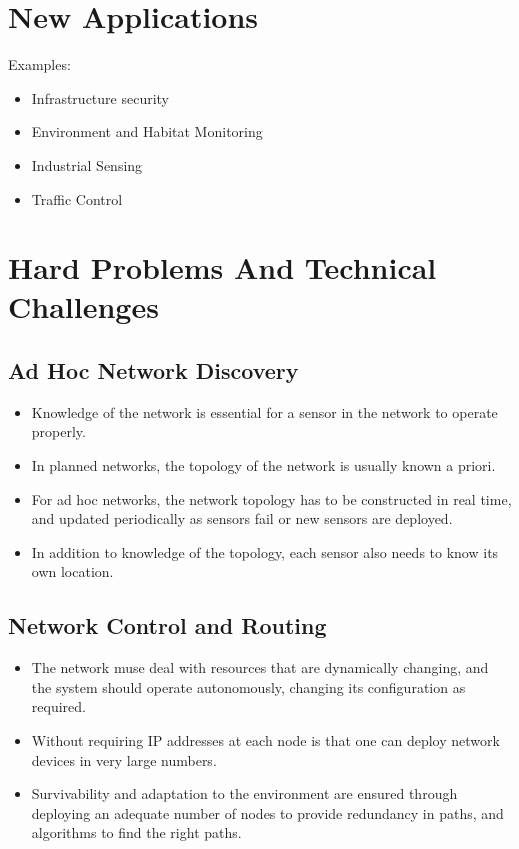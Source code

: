 \documentclass[letterpaper,10pt]{article}
\begin{document}
\section{New Applications}

Examples:
\begin{itemize}
	\item Infrastructure security
	\item Environment and Habitat Monitoring
	\item Industrial Sensing
	\item Traffic Control
\end{itemize}


\section{Hard Problems And Technical Challenges}

\subsection{Ad Hoc Network Discovery}

\begin{itemize}
	\item Knowledge of the network is essential for a sensor in the network to operate properly.
	\item In planned networks, the topology of the network is usually known a priori.
	\item For ad hoc networks, the network topology has to be constructed in real time, and updated periodically as sensors fail or new sensors are deployed.
	\item In addition to knowledge of the topology, each sensor also needs to know its own location.
\end{itemize}

\subsection{Network Control and Routing}

\begin{itemize}
	\item The network muse deal with resources that are dynamically changing, and the system should operate autonomously, changing its configuration as required.
	\item Without requiring IP addresses at each node is that one can deploy network devices in very large numbers.
	\item Survivability and adaptation to the environment are ensured through deploying an adequate number of nodes to provide redundancy in paths, and algorithms to find the right paths.
\end{itemize}
\end{document}
